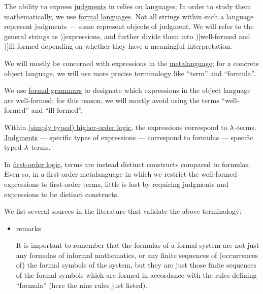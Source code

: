 \begin{concept}\label{con:expression}
  The ability to express \hyperref[con:judgment]{judgments} in relies on languages; In order to study them mathematically, we use \hyperref[def:formal_language]{formal languages}. Not all strings within such a language represent judgments --- some represent objects of judgment. We will refer to the general strings as \term[en=formal expressions (\cite[217]{Kleene2002Logic})]{expressions}, and further divide them into \term[en=well-formed (formula) (\cite[217]{Kleene2002Logic})]{well-formed} and \term[en=ill-formed (statement) (\cite[266]{Tao2022AnalysisI})]{ill-formed} depending on whether they have a meaningful interpretation.
\end{concept}
\begin{comments}
  \item We will mostly be concerned with expressions in the \hyperref[con:metalogic]{metalanguage}; for a concrete object language, we will use more precise terminology like \enquote{term} and \enquote{formula}.

  \item We use \hyperref[def:formal_grammar]{formal grammars} to designate which expressions in the object language are well-formed; for this reason, we will mostly avoid using the terms \enquote{well-formed} and \enquote{ill-formed}.

  \item Within \hyperref[def:simply_typed_hol]{(simply typed) higher-order logic}, the expressions correspond to \( {\mathrm \lambda} \)-terms. \hyperref[con:judgment]{Judgments} --- specific types of expressions --- correspond to formulas --- specific typed \( {\mathrm \lambda} \)-terms.

  In \hyperref[def:first_order_syntax]{first-order logic}, terms are instead distinct constructs compared to formulas. Even so, in a first-order metalanguage in which we restrict the well-formed expressions to first-order terms, little is lost by requiring judgments and expressions to be distinct constructs.

  \item We list several sources in the literature that validate the above terminology:
  \begin{itemize}
    \item {} remarks
    \begin{displayquote}
      It is important to remember that the formulas of a formal system are not just any formulas of informal mathematics, or any finite sequences of (occurrences of) the formal symbols of the system, but they are just those finite sequences of the formal symbols which are formed in accordance with the rules defining \enquote{formula} (here the nine rules just listed).


\end{displayquote}
\end{itemize}
\end{comments}
